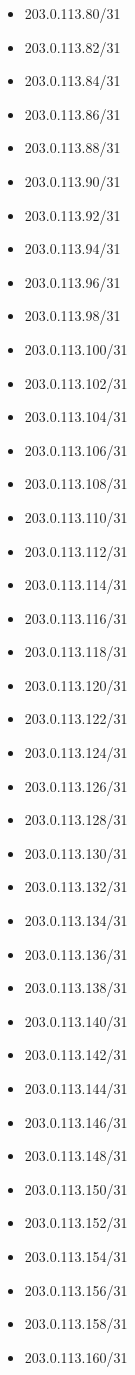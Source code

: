 \documentclass[a4paper,10pt]{article}
\begin{document}
\begin{itemize}
  \item 203.0.113.80/31
  \item 203.0.113.82/31
  \item 203.0.113.84/31
  \item 203.0.113.86/31
  \item 203.0.113.88/31
  \item 203.0.113.90/31
  \item 203.0.113.92/31
  \item 203.0.113.94/31
  \item 203.0.113.96/31
  \item 203.0.113.98/31
  \item 203.0.113.100/31
  \item 203.0.113.102/31
  \item 203.0.113.104/31
  \item 203.0.113.106/31
  \item 203.0.113.108/31
  \item 203.0.113.110/31
  \item 203.0.113.112/31
  \item 203.0.113.114/31
  \item 203.0.113.116/31
  \item 203.0.113.118/31
  \item 203.0.113.120/31
  \item 203.0.113.122/31
  \item 203.0.113.124/31
  \item 203.0.113.126/31
  \item 203.0.113.128/31
  \item 203.0.113.130/31
  \item 203.0.113.132/31
  \item 203.0.113.134/31
  \item 203.0.113.136/31
  \item 203.0.113.138/31
  \item 203.0.113.140/31
  \item 203.0.113.142/31
  \item 203.0.113.144/31
  \item 203.0.113.146/31
  \item 203.0.113.148/31
  \item 203.0.113.150/31
  \item 203.0.113.152/31
  \item 203.0.113.154/31
  \item 203.0.113.156/31
  \item 203.0.113.158/31
  \item 203.0.113.160/31

\end{itemize}
\end{document}
